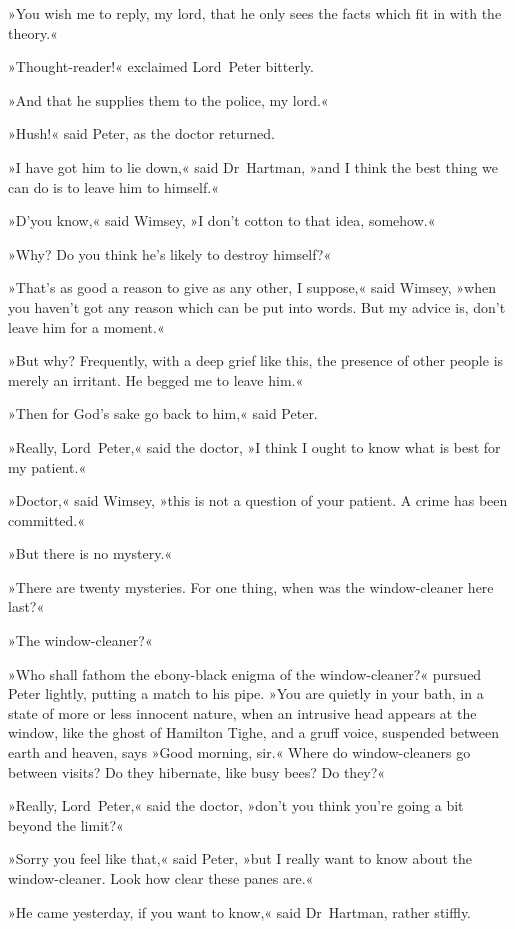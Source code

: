 »You wish me to reply, my lord, that he only sees the facts which fit in with the theory.«

»Thought-reader!« exclaimed Lord~Peter bitterly.

»And that he supplies them to the police, my lord.«

»Hush!« said Peter, as the doctor returned.

»I have got him to lie down,« said Dr~Hartman, »and I think the best thing we can do is to leave him to himself.«

»D'you know,« said Wimsey, »I don't cotton to that idea, somehow.«

»Why? Do you think he's likely to destroy himself?«

»That's as good a reason to give as any other, I suppose,« said Wimsey, »when you haven't got any reason which can be put into words. But my advice is, don't leave him for a moment.«

»But why? Frequently, with a deep grief like this, the presence of other people is merely an irritant. He begged me to leave him.«

»Then for God's sake go back to him,« said Peter.

»Really, Lord~Peter,« said the doctor, »I think I ought to know what is best for my patient.«

»Doctor,« said Wimsey, »this is not a question of your patient. A crime has been committed.«

»But there is no mystery.«

»There are twenty mysteries. For one thing, when was the window-cleaner here last?«

»The window-cleaner?«

»Who shall fathom the ebony-black enigma of the window-cleaner?« pursued Peter lightly, putting a match to his pipe. »You are quietly in your bath, in a state of more or less innocent nature, when an intrusive head appears at the window, like the ghost of Hamilton Tighe, and a gruff voice, suspended between earth and heaven, says »Good morning, sir.« Where do window-cleaners go between visits? Do they hibernate, like busy bees? Do they\longdash?«

»Really, Lord~Peter,« said the doctor, »don't you think you're going a bit beyond the limit?«

»Sorry you feel like that,« said Peter, »but I really want to know about the window-cleaner. Look how clear these panes are.«

»He came yesterday, if you want to know,« said Dr~Hartman, rather stiffly.

